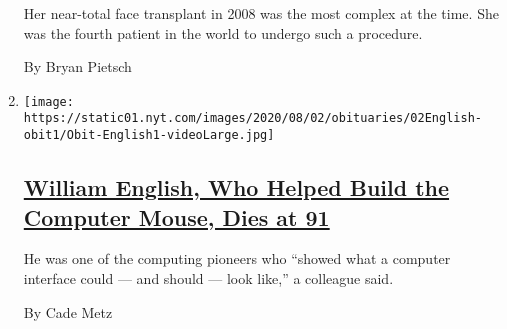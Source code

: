 \begin{enumerate}
  Her near-total face transplant in 2008 was the most complex at the
  time. She was the fourth patient in the world to undergo such a
  procedure.

  By Bryan Pietsch
\item
  \texttt{[image: https://static01.nyt.com/images/2020/08/02/obituaries/02English-obit1/Obit-English1-videoLarge.jpg]}

  \hypertarget{william-english-who-helped-build-the-computer-mouse-dies-at-91}{%
  \subsection{\texorpdfstring{\href{/2020/07/31/technology/william-english-who-helped-build-the-computer-mouse-dies-at-91.html}{William
  English, Who Helped Build the Computer Mouse, Dies at
  91}}{William English, Who Helped Build the Computer Mouse, Dies at 91}}\label{william-english-who-helped-build-the-computer-mouse-dies-at-91}}

  He was one of the computing pioneers who ``showed what a computer
  interface could --- and should --- look like,'' a colleague said.

  By Cade Metz
\end{enumerate}

